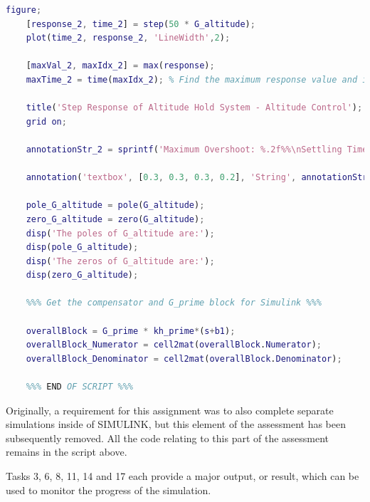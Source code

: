 \documentclass[stu, a4paper, 12pt, floatsintext]{apa7}
\numberwithin{figure}{section}
\numberwithin{table}{section}
\numberwithin{equation}{section}
\begin{document}
\begin{lstlisting}[language=MATLAB]
    figure;
    [response_2, time_2] = step(50 * G_altitude);
    plot(time_2, response_2, 'LineWidth',2);
    
    [maxVal_2, maxIdx_2] = max(response); 
    maxTime_2 = time(maxIdx_2); % Find the maximum response value and its time
    
    title('Step Response of Altitude Hold System - Altitude Control');
    grid on;
    
    annotationStr_2 = sprintf('Maximum Overshoot: %.2f%%\nSettling Time: %.2f s\nFinal Value: %.2f', overshoot_2, settlingTime_2, finalValue_2); % Creates the annotation text with variable placeholders.
    
    annotation('textbox', [0.3, 0.3, 0.3, 0.2], 'String', annotationStr_2, 'FitBoxToText', 'on', 'BackgroundColor', '#ADD8E6', 'EdgeColor', 'black', 'FontSize', 50); % Creates the annotation with a text box.
    
    pole_G_altitude = pole(G_altitude);
    zero_G_altitude = zero(G_altitude);
    disp('The poles of G_altitude are:');
    disp(pole_G_altitude);
    disp('The zeros of G_altitude are:');
    disp(zero_G_altitude);
    
    %%% Get the compensator and G_prime block for Simulink %%%
    
    overallBlock = G_prime * kh_prime*(s+b1);
    overallBlock_Numerator = cell2mat(overallBlock.Numerator);
    overallBlock_Denominator = cell2mat(overallBlock.Denominator);
    
    %%% END OF SCRIPT %%%
\end{lstlisting}

Originally, a requirement for this assignment was to also complete separate simulations inside of SIMULINK, but this element of the assessment has been subsequently removed. All the code relating to this part of the assessment remains in the script above. 

Tasks 3, 6, 8, 11, 14 and 17 each provide a major output, or result, which can be used to monitor the progress of the simulation.
\end{document}
